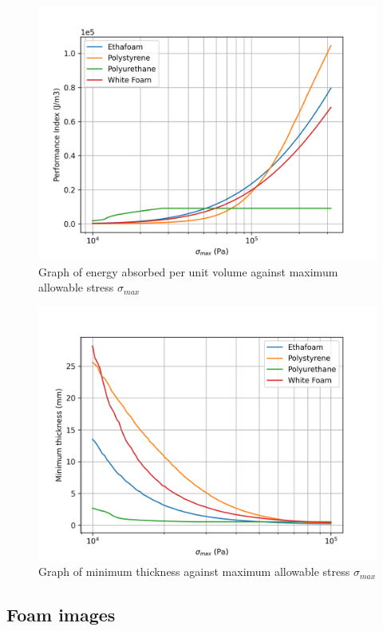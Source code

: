 \documentclass{article}
\begin{document}
\begin{figure}[H]
\centering
\includegraphics[width=1\textwidth]{vol_performance_vs_fragility.png}
\caption{\label{fig:vol_performance_vs_fragility} Graph of energy absorbed per unit volume against maximum allowable stress $\sigma_{max}$}
\end{figure}

\begin{figure}[H]
\centering
\includegraphics[width=1\textwidth]{thickness_vs_fragility.png}
\caption{\label{fig:thickness_vs_fragility} Graph of minimum thickness against maximum allowable stress $\sigma_{max}$}
\end{figure}

\subsection{Foam images}
\end{document}
